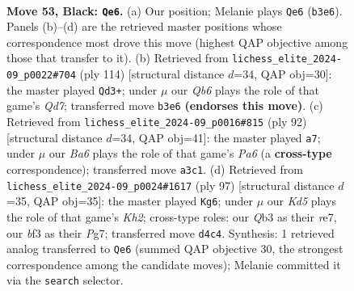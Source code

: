 \documentclass[11pt]{article}
\begin{document}
\clearpage

\begin{figure}[p]\centering
\begin{subfigure}{0.46\textwidth}\centering
\resizebox{\linewidth}{!}{%
\newchessgame
\chessboard[
  setfen={8/p7/5P2/R7/1p1k4/bq3BK1/8/8 b - - 1 53},
  showmover=false,
  pgfstyle=straightmove, color=movearrow, markmove={b3-e6}
]}
\caption{}
\end{subfigure}\hfill
\begin{subfigure}{0.46\textwidth}\centering
\resizebox{\linewidth}{!}{%
\newchessgame
\chessboard[
  setfen={8/3Q2bk/5r2/8/8/7P/5PK1/8 w - - 7 58},
  showmover=false,
  pgfstyle=straightmove, color=movearrow, markmove={d7-d3}
]}
\caption{}
\end{subfigure}
\\[4pt]
\begin{subfigure}{0.46\textwidth}\centering
\resizebox{\linewidth}{!}{%
\newchessgame
\chessboard[
  setfen={8/1Q2bk1p/P5pP/r7/8/2P5/6K1/8 w - - 2 47},
  showmover=false,
  pgfstyle=straightmove, color=movearrow, markmove={a6-a7}
]}
\caption{}
\end{subfigure}\hfill
\begin{subfigure}{0.46\textwidth}\centering
\resizebox{\linewidth}{!}{%
\newchessgame
\chessboard[
  setfen={8/4R1pk/p7/7p/6b1/2K1p3/8/6R1 b - - 3 49},
  showmover=false,
  pgfstyle=straightmove, color=movearrow, markmove={h7-g6}
]}
\caption{}
\end{subfigure}
\caption{\textbf{Move 53, Black: \texttt{Qe6}.} (a) Our position; Melanie plays \texttt{Qe6} (\texttt{b3e6}). Panels (b)--(d) are the retrieved master positions whose correspondence most drove this move (highest QAP objective among those that transfer to it). (b) Retrieved from \texttt{lichess\_elite\_2024-09\_p0022\#704} (ply 114) [structural distance $d$=34, QAP obj=30]: the master played \texttt{Qd3+}; under $\mu$ our \emph{Qb6} plays the role of that game's \emph{Qd7}; transferred move \texttt{b3e6} \textbf{(endorses this move)}. (c) Retrieved from \texttt{lichess\_elite\_2024-09\_p0016\#815} (ply 92) [structural distance $d$=34, QAP obj=41]: the master played \texttt{a7}; under $\mu$ our \emph{Ba6} plays the role of that game's \emph{Pa6} (a \textbf{cross-type} correspondence); transferred move \texttt{a3c1}. (d) Retrieved from \texttt{lichess\_elite\_2024-09\_p0024\#1617} (ply 97) [structural distance $d$=35, QAP obj=35]: the master played \texttt{Kg6}; under $\mu$ our \emph{Kd5} plays the role of that game's \emph{Kh2}; cross-type roles: our \emph{Q}b3 as their \emph{r}e7, our \emph{b}f3 as their \emph{P}g7; transferred move \texttt{d4c4}. Synthesis: 1 retrieved analog transferred to \texttt{Qe6} (summed QAP objective 30, the strongest correspondence among the candidate moves); Melanie committed it via the \texttt{search} selector.}
\label{fig:thought-m105}
\end{figure}
\end{document}
